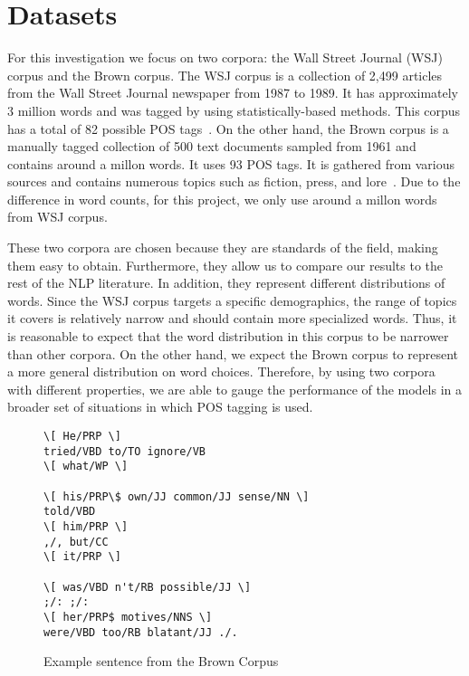 \section{Datasets}
\label{sec:datasets}
For this investigation we focus on two corpora: the Wall Street Journal (WSJ) corpus and the Brown corpus. The WSJ corpus is a collection of 2,499 articles from the Wall Street Journal newspaper from 1987 to 1989. It has approximately 3 million words and was tagged by using statistically-based methods. This corpus has a total of 82 possible POS tags~\cite{wsjCorpus}. On the other hand, the Brown corpus is a manually tagged collection of 500 text documents sampled from 1961 and contains around a millon words. It uses 93 POS tags. It is gathered from various sources and contains numerous topics such as fiction, press, and lore~\cite{brownCorpus}. Due to the difference in word counts, for this project, we only use around a millon words from WSJ corpus.

These two corpora are chosen because they are standards of the field, making them easy to obtain. Furthermore, they allow us to compare our results to the rest of the NLP literature. In addition, they represent different distributions of words. Since the WSJ corpus targets a specific demographics, the range of topics it covers is relatively narrow and should contain more specialized words. Thus, it is reasonable to expect that the word distribution in this corpus to be narrower than other corpora. On the other hand, we expect the Brown corpus to represent a more general distribution on word choices. Therefore, by using two corpora with different properties, we are able to gauge the performance of the models in a broader set of situations in which POS tagging is used.

\begin{figure}[ht]
 \begin{Verbatim}[frame=single,framesep=5mm]
\[ He/PRP \]
tried/VBD to/TO ignore/VB
\[ what/WP \]

\[ his/PRP\$ own/JJ common/JJ sense/NN \]
told/VBD
\[ him/PRP \]
,/, but/CC
\[ it/PRP \]

\[ was/VBD n't/RB possible/JJ \]
;/: ;/:
\[ her/PRP$ motives/NNS \]
were/VBD too/RB blatant/JJ ./.
\end{Verbatim}
\caption{Example sentence from the Brown Corpus~\cite{brownCorpus} \label{brownExample}}
\end{figure}
